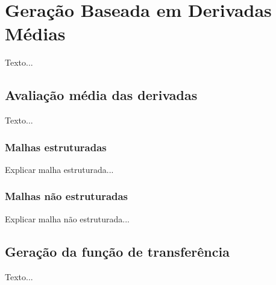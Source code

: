 
\chapter{Geração Baseada em Derivadas Médias}
\label{my}

	Texto...

\section{Avaliação média das derivadas}
\label{my.deriv}
	Texto...
    
\subsection{Malhas estruturadas}
\label{my.struct}
	Explicar malha estruturada...

\subsection{Malhas não estruturadas}
\label{my.nonstruct}
	Explicar malha não estruturada...

\section{Geração da função de transferência}
\label{my.tf}
	Texto...